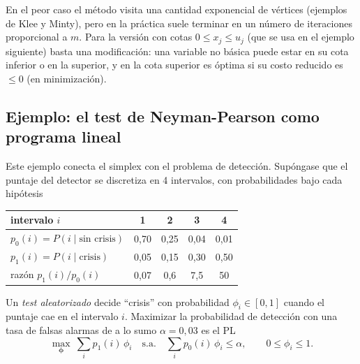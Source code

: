 En el peor caso el método visita una cantidad exponencial de vértices (ejemplos de Klee y Minty), pero en la
práctica suele terminar en un número de iteraciones proporcional a $m$. Para la versión con cotas
$0 \le x_j \le u_j$ (que se usa en el ejemplo siguiente) basta una modificación: una variable no básica puede
estar en su cota inferior o en la superior, y en la cota superior es óptima si su costo reducido es $\le 0$
(en minimización).

\subsection{Ejemplo: el test de Neyman-Pearson como programa lineal}
\label{sec:np_pl}

Este ejemplo conecta el simplex con el problema de detección. Supóngase que el puntaje del detector se
discretiza en 4 intervalos, con probabilidades bajo cada hipótesis
\begin{center}
\begin{tabular}{lcccc}
\toprule
intervalo $i$ & 1 & 2 & 3 & 4 \\
\midrule
$p_0(i) = P(i \mid \text{sin crisis})$ & 0,70 & 0,25 & 0,04 & 0,01 \\
$p_1(i) = P(i \mid \text{crisis})$     & 0,05 & 0,15 & 0,30 & 0,50 \\
razón $p_1(i)/p_0(i)$                  & 0,07 & 0,6  & 7,5  & 50 \\
\bottomrule
\end{tabular}
\end{center}
Un \emph{test aleatorizado} decide ``crisis'' con probabilidad $\phi_i \in [0,1]$ cuando el puntaje cae en el
intervalo $i$. Maximizar la probabilidad de detección con una tasa de falsas alarmas de a lo sumo
$\alpha = 0{,}03$ es el PL
\begin{equation}
  \max_{\boldsymbol\phi}\ \sum_{i} p_1(i)\,\phi_i
  \quad\text{s.a.}\quad
  \sum_i p_0(i)\,\phi_i \le \alpha, \qquad 0 \le \phi_i \le 1.
  \label{eq:np_pl}
\end{equation}


